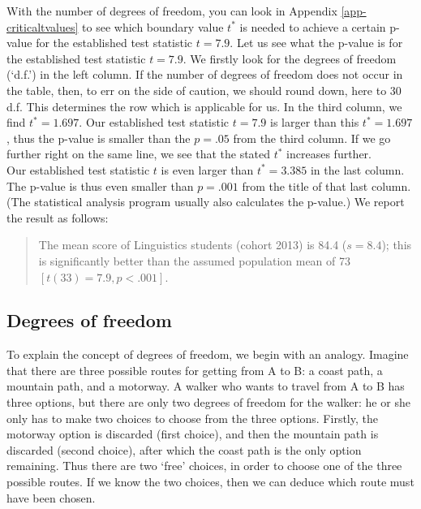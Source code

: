 \documentclass[
]{book}
\begin{document}
With the number of degrees of freedom, you can look in Appendix
\ref{app-criticaltvalues} to see which boundary value \(t^*\) is needed
to achieve a certain p-value for the established test statistic
\(t=7.9\). Let us see what the p-value is for the established
test statistic \(t=7.9\). We firstly look for the degrees of freedom (`d.f.') in the left column.
If the number of degrees of freedom does not occur in the table, then, to err
on the side of caution, we should round down, here to 30 d.f. This determines the row
which is applicable for us. In the third column, we find \(t^*=1.697\). Our
established test statistic \(t=7.9\) is larger than this \(t^*=1.697\), thus the p-value
is smaller than the \(p=.05\) from the third column. If we go further right on
the same line, we see that the stated \(t^*\) increases further.\\
Our established test statistic \(t\) is even larger than \(t^*=3.385\) in the last column.
The p-value is thus even smaller than \(p=.001\) from the title of that last
column. (The statistical analysis program usually also calculates the p-value.)
We report the result as follows:

\begin{quote}
The mean score of Linguistics students (cohort 2013) is
84.4 (\(s=8.4\)); this is significantly better than the assumed
population mean of 73 \([t(33)=7.9, p<.001]\).
\end{quote}

\subsection{Degrees of freedom}\label{sec:ttest-freedomdegrees}

To explain the concept of degrees of freedom, we begin with an
analogy. Imagine that there are three possible routes for getting
from A to B: a coast path, a mountain path, and a motorway. A walker
who wants to travel from A to B has three options, but there are only
two degrees of freedom for the walker: he or she only has to make
two choices to choose from the three options. Firstly, the motorway option is discarded (first choice),
and then the mountain path is discarded (second choice),
after which the coast path is the only option remaining.
Thus there are two `free' choices,
in order to choose one of the three possible routes.
If we know the two choices, then we can deduce which
route must have been chosen.
\end{document}
